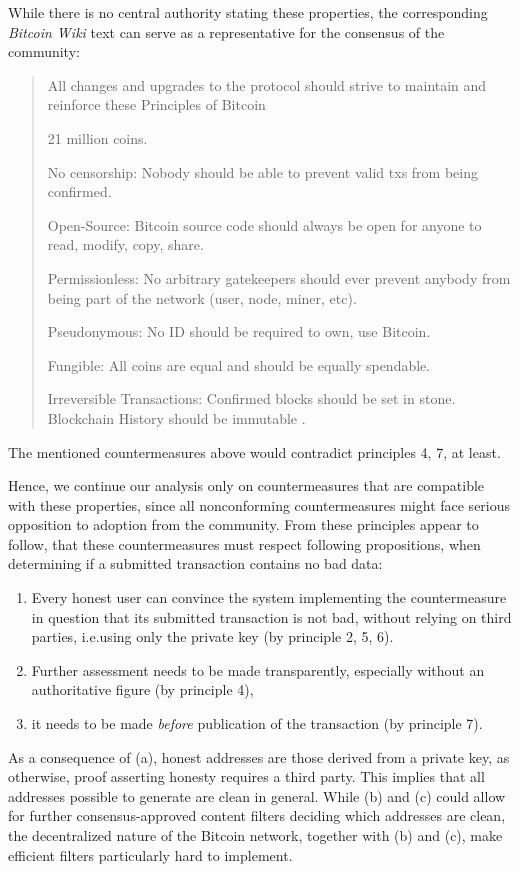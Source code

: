 \documentclass[a4paper,11pt,titlepage]{scrbook}
\begin{document}
While there is no central authority stating these properties, the corresponding \emph{Bitcoin Wiki} text can serve as a representative for the consensus of the community:
\begin{quote}
    \noindent\textooquote
    All changes and upgrades to the protocol should strive to maintain and reinforce these Principles of Bitcoin

    \begin{enumerate}[label={[}\arabic*.{]}]
        \item 21 million coins.
        \item No censorship: Nobody should be able to prevent valid txs from being confirmed.
        \item Open-Source: Bitcoin source code should always be open for anyone to read, modify, copy, share.
        \item Permissionless: No arbitrary gatekeepers should ever prevent anybody from being part of the network (user, node, miner, etc).
        \item Pseudonymous: No ID should be required to own, use Bitcoin.
        \item Fungible: All coins are equal and should be equally spendable.
        \item Irreversible Transactions: Confirmed blocks should be set in stone. Blockchain History should be immutable\textcoquote{} \cite{bitcoinwiki_principles_2017}.
    \end{enumerate}
\end{quote}
The mentioned countermeasures above would contradict principles 4, 7, at least.

Hence, we continue our analysis only on countermeasures that are compatible with these properties,
since all nonconforming countermeasures might face serious opposition to adoption from the community.
From these principles appear to follow, that these countermeasures must respect following propositions, when determining if a submitted transaction contains no bad data:
\begin{enumerate}
    \item Every honest user can convince the system implementing the countermeasure in question that its submitted transaction is not bad, without relying on third parties, i.e.\@ using only the private key (by principle 2, 5, 6).
    \item Further assessment needs to be made transparently, especially without an authoritative figure (by principle 4),
    \item it needs to be made \emph{before} publication of the transaction (by principle 7).
\end{enumerate}
As a consequence of (a), honest addresses are those derived from a private key, as otherwise, proof asserting honesty requires a third party.
This implies that all addresses possible to generate are clean in general.
While (b) and (c) could allow for further consensus-approved content filters deciding which addresses are clean, the decentralized nature of the Bitcoin network, together with (b) and (c), make efficient filters particularly hard to implement.
\end{document}
